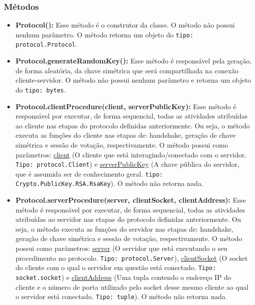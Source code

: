 \documentclass[10pt]{article}
\begin{document}
\begin{itemize}
        \subsubsection{\large Métodos}
            \begin{itemize}
             \item \textbf{Protocol():} Esse método é o construtor da classe. O método não possui nenhum parâmetro. O método retorna um objeto do \texttt{tipo: protocol.Protocol}.
             \item \textbf{Protocol.generateRandomKey():} Esse método é responsável pela geração, de forma aleatória, da chave simétrica que será compartilhada na conexão cliente-servidor. O método não possui nenhum parâmetro e retorna um objeto do \texttt{tipo: bytes}.
             \item \textbf{Protocol.clientProcedure(client, serverPublicKey):} Esse método é responsável por executar, de forma sequencial, todas as atividades atribuídas ao cliente nas etapas do protocolo definidas anteriormente. Ou seja, o método executa as funções do cliente nas etapas de: handshake, geração de chave simétrica e sessão de votação, respectivamente. O método possui como parâmetros: \underline{client} (O cliente que está interagindo/conectado com o servidor. \texttt{Tipo: protocol.Client}) e \underline{serverPublicKey} (A chave pública do servidor, que é assumida ser de conhecimento geral. \texttt{tipo: Crypto.PublicKey.RSA.RsaKey}). O método não retorna nada.
             \item \textbf{Protocol.serverProcedure(server, clientSocket, clientAddress):} Esse método é responsável por executar, de forma sequencial, todas as atividades atribuídas ao servidor nas etapas do protocolo definidas anteriormente. Ou seja, o método executa as funções do servidor nas etapas de: handshake, geração de chave simétrica e sessão de votação, respectivamente. O método possui como parâmetros: \underline{server} (O servidor que está executando o seu procedimento no protocolo. \texttt{Tipo: protocol.Server}), \underline{clientSocket} (O socket do cliente com o qual o servidor em questão está conectado. \texttt{Tipo: socket.socket}) e \underline{clientAddress} (Uma tupla contendo o endereço IP do cliente e o número de porta utilizado pelo socket desse mesmo cliente ao qual o servidor está conectado. \texttt{Tipo: tuple}). O método não retorna nada.
            \end{itemize}
    \end{itemize}
\end{document}
